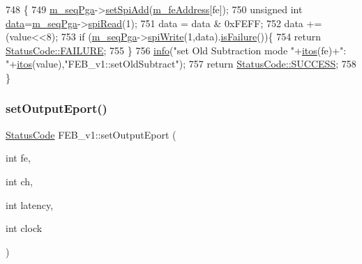 \begin{DoxyCode}
748                                                      \{
749   \hyperlink{classFEB__v1_a6c7804ac86796f233a8393043adf2e77}{m\_seqPga}->\hyperlink{classSeqPGA_ac998ce3a6d9b5f2e88cc8393f8c1df53}{setSpiAdd}(\hyperlink{classFEB__v1_a4e1945c2d5b434125f375e9d0fc6d99f}{m\_feAddress}[fe]);
750   \textcolor{keywordtype}{unsigned} \textcolor{keywordtype}{int} \hyperlink{classFEB__v1_a6bca4320bd3bbbc32efc81097f33421a}{data}=\hyperlink{classFEB__v1_a6c7804ac86796f233a8393043adf2e77}{m\_seqPga}->\hyperlink{classSeqPGA_ab3d0e5e5d4014bc7a92588a76b8713d4}{spiRead}(1);
751   data = data & 0xFEFF;
752   data += (value<<8);
753   \textcolor{keywordflow}{if} (\hyperlink{classFEB__v1_a6c7804ac86796f233a8393043adf2e77}{m\_seqPga}->\hyperlink{classSeqPGA_ad4421841ce4ce8b88ad13f63216f0743}{spiWrite}(1,data).\hyperlink{classStatusCode_a5dd22dc6eb2c52fc4cabc58f6dea2eb7}{isFailure}())\{
754     \textcolor{keywordflow}{return} \hyperlink{classStatusCode_a6f565cbeadc76d14c72f047e5e85eb4ba3da73d4c469762eb9d3c960368252b26}{StatusCode::FAILURE};
755   \}
756   \hyperlink{classObject_a644fd329ea4cb85f54fa6846484b84a8}{info}(\textcolor{stringliteral}{"set Old Subtraction mode "}+\hyperlink{Tools_8h_af330027dbdafb9a30768b3613c553e60}{itos}(fe)+\textcolor{stringliteral}{": "}+\hyperlink{Tools_8h_af330027dbdafb9a30768b3613c553e60}{itos}(value),\textcolor{stringliteral}{"FEB\_v1::setOldSubtract"});
757   \textcolor{keywordflow}{return} \hyperlink{classStatusCode_a6f565cbeadc76d14c72f047e5e85eb4badd0da38d3ba0d922efd1f4619bc37ad8}{StatusCode::SUCCESS};
758 \}
\end{DoxyCode}
\mbox{\label{classFEB__v1_ae8ed47630ca1408647e3eb5c1dfa0ec0}} 
\subsubsection{\texorpdfstring{set\+Output\+Eport()}{setOutputEport()}}
{\footnotesize\ttfamily \hyperlink{classStatusCode}{Status\+Code} F\+E\+B\+\_\+v1\+::set\+Output\+Eport (\begin{DoxyParamCaption}\item[{int}]{fe,  }\item[{int}]{ch,  }\item[{int}]{latency,  }\item[{int}]{clock }\end{DoxyParamCaption})}



